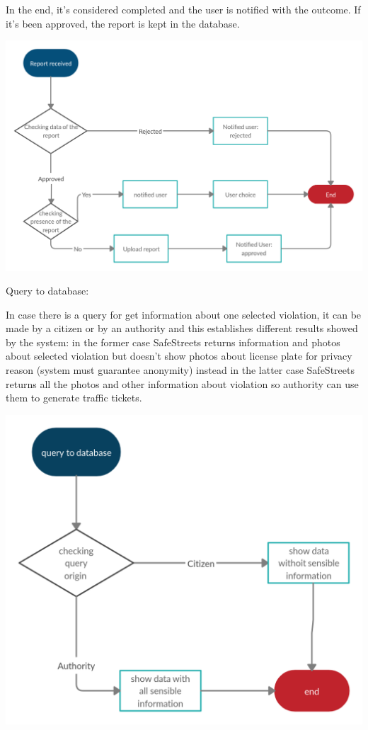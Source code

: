 \documentclass[../RASD.tex]{subfiles}
\begin{document}
    In the end, it’s considered completed and the user is notified with the outcome. If it’s been approved, the report is kept in the database.
    \begin{center}
        \includegraphics[scale = 0.3]{assets/newReportV2.png}\\
    \end{center}

    Query to database:

    In case there is a query for get information about one selected violation, it can be made by a citizen or by an authority and this establishes different results showed by the system: in the former case SafeStreets returns information and photos about selected violation but doesn’t show photos about license plate for privacy reason (system must guarantee anonymity) instead in the latter case SafeStreets returns all the photos and other information about violation so authority can use them to generate traffic tickets.

    \begin{center}
        \includegraphics[scale = 0.3]{assets/queryDbV1.png}\\
    \end{center}
\end{document}
